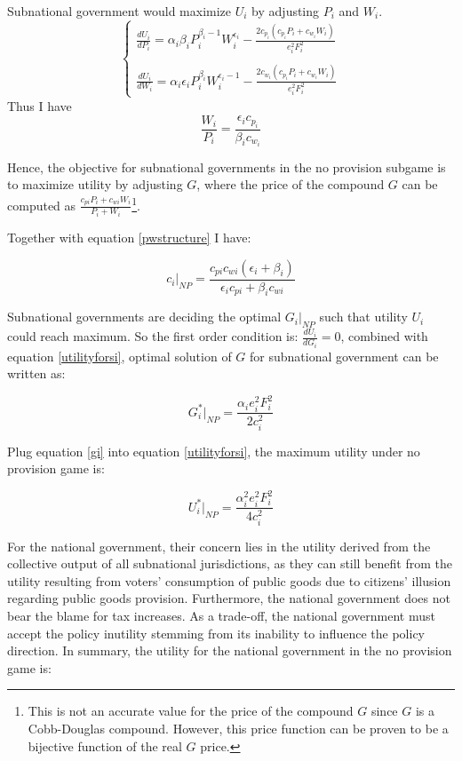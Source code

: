 Subnational government would maximize $U_i$ by adjusting $P_i$ and $W_i$.
$$
    \left\{\begin{array}{l}
        \frac{dU_i}{dP_i}= \alpha_i \beta_i P_i^{\beta_i-1}W_i^{\epsilon_i}-\frac{2 c_{p_i}(c_{p_i}P_i+c_{w_i}W_i)}{e_i^2 F_i^2} \\ \\

        \frac{dU_i}{dW_i}=  \alpha_i \epsilon_i P_i^{\beta_i}W_i^{\epsilon_i-1}-\frac{2 c_{w_i}(c_{p_i}P_i+c_{w_i}W_i)}{e_i^2 F_i^2}\end{array}\right.
$$
Thus I have
\begin{equation}
    \frac{W_i}{P_i}=\frac{\epsilon_i c_{p_i}}{\beta_ic_{w_i}}\label{pwstructure}
\end{equation}

Hence, the objective for subnational governments in the no provision subgame is to maximize utility by adjusting $G$, where the price of the compound $G$ can be computed as $\frac{c_{pi}P_i+c_{wi}W_i}{P_i+W_i}$\footnote{This is not an accurate value for the price of the compound $G$ since $G$ is a Cobb-Douglas compound. However, this price function can be proven to be a bijective function of the real $G$ price.}.

Together with equation \ref{pwstructure} I have:

\begin{equation}
    c_i|_{NP}=\frac{c_{pi}c_{wi}(\epsilon_i+\beta_i)}{\epsilon_ic_{pi}+\beta_i c_{wi}}
\end{equation}

Subnational governments are deciding the optimal $G_i|_{NP}$ such that utility $U_i$ could reach maximum. So the first order condition is:
$\frac{dU_i}{dG_i}=0$, combined with equation \ref{utilityforsi}, optimal solution of $G$ for subnational government can be written as:

\begin{equation}
    G_i^*|_{NP}=\frac{\alpha_i e_i^2 F_i^2}{2 c_i^2} \label{gi}
\end{equation}

Plug equation \ref{gi} into equation \ref{utilityforsi}, the maximum utility under no provision game is:

\begin{equation}
    U_i^*|_{NP}=\frac{\alpha_i^2 e_i^2 F_i^2}{4c_i^2} \label{uforsiinnp}
\end{equation}

For the national government, their concern lies in the utility derived from the collective output of all subnational jurisdictions, as they can still benefit from the utility resulting from voters' consumption of public goods due to citizens' illusion regarding public goods provision. Furthermore, the national government does not bear the blame for tax increases. As a trade-off, the national government must accept the policy inutility stemming from its inability to influence the policy direction. In summary, the utility for the national government in the no provision game is: %

